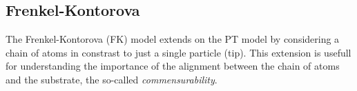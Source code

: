 








\subsection{Frenkel-Kontorova}

The Frenkel-Kontorova (\acrshort{FK}) model \cite{Frenkel_1938} extends on the \acrshort{PT} model by considering a chain of atoms in constrast to just a single particle (tip). This extension is usefull for understanding the importance of the alignment between the chain of atoms and the substrate, the so-called \textit{commensurability}.

